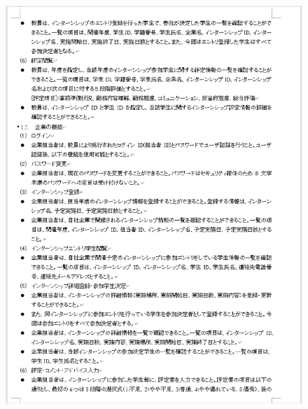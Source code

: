 \documentclass[uplatex, report, a4j, 10pt]{jsbook}
\begin{document}
\begin{figure}[tp]
    \begin{center}
    \includegraphics[width=\hsize]{specification/internship_2.eps}

    \end{center}
\end{figure}
\end{document}

